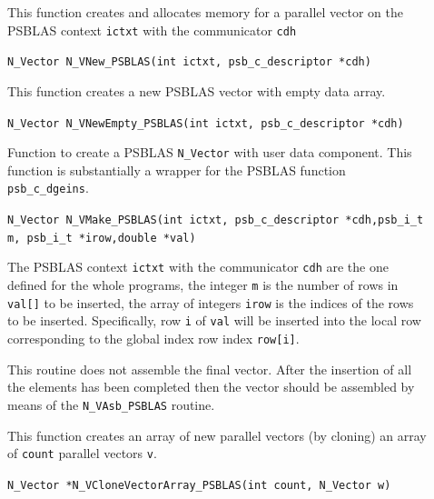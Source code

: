 \documentclass[twoside,a4paper]{refart}
\theoremstyle{definition}
\begin{document}
\begin{description}
	\item[] This function creates and allocates memory for a parallel vector
	on the PSBLAS context \lstinline[style=CStyle]|ictxt| with the communicator \lstinline[style=CStyle]|cdh|
	
	 \lstinline[style=CStyle]|N_Vector N_VNew_PSBLAS(int ictxt, psb_c_descriptor *cdh)|
	
	\item[] This function creates a new PSBLAS vector with empty data array.
	
	 \lstinline[style=CStyle]|N_Vector N_VNewEmpty_PSBLAS(int ictxt, psb_c_descriptor *cdh)|
	
	\item[] Function to create a PSBLAS \texttt{N\_Vector} with user data component. This function is substantially a wrapper for the PSBLAS function \lstinline[style=CStyle]|psb_c_dgeins|.
	
	 \lstinline[style=CStyle]|N_Vector N_VMake_PSBLAS(int ictxt, psb_c_descriptor *cdh,psb_i_t m, psb_i_t *irow,double *val)|
	
	The PSBLAS context \lstinline[style=CStyle]|ictxt| with the communicator \lstinline[style=CStyle]|cdh| are the one defined for the whole programs, the integer \lstinline[style=CStyle]{m} is the number of rows in \lstinline[style=CStyle]{val[]} to be inserted, the array of integers \lstinline[style=CStyle]{irow} is the indices of the rows to be inserted. Specifically, row \lstinline[style=CStyle]|i| of \lstinline[style=CStyle]|val| will be inserted into the local row corresponding to the global index row index \lstinline[style=CStyle]|row[i]|.
	
	\attention This routine does not assemble the final vector. After the insertion of all the elements has been completed then the vector should be assembled by means of the \texttt{N\_VAsb\_PSBLAS} routine.
	
	\item[] This function creates an array of new parallel vectors (by cloning) an array of \lstinline[style=CStyle]|count| parallel vectors \lstinline[style=CStyle]|v|.
	
	 \lstinline[style=CStyle]|N_Vector *N_VCloneVectorArray_PSBLAS(int count, N_Vector w)|
	

\end{description}
\end{document}
